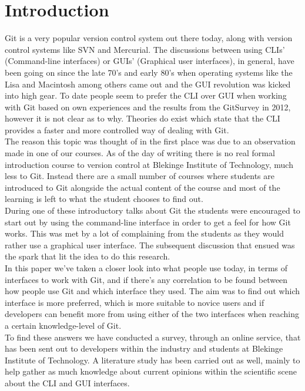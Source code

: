 \documentclass[a4paper,oneside]{bth} %
\begin{document}
		\chapter{Introduction}
		Git is a very popular version control system out there today, along with version control systems like SVN and Mercurial. The discussions between using CLIs' (Command-line interfaces) or GUIs' (Graphical user interfaces), in general, have been going on since the late 70's and early 80's when operating systems like the Lisa and Macintosh among others came out \cite{HistoryOfGUIWiki} and the GUI revolution was kicked into high gear.
		To date people seem to prefer the CLI over GUI when working with Git based on own experiences and the results from the GitSurvey in 2012\cite{GitUserSurvey}, however it is not clear as to why.
		Theories do exist which state that the CLI provides a faster and more controlled way of dealing with Git. \cite{GitUserSurvey}\cite{GitInClassroom}
		\\
		The reason this topic was thought of in the first place was due to an observation made in one of our courses. As of the day of writing there is no real formal introduction course to version control at Blekinge Institute of Technology, much less to Git. Instead there are a small number of courses where students are introduced to Git alongside the actual content of the course and most of the learning is left to what the student chooses to find out.\\
		During one of these introductory talks about Git the students were encouraged to start out by using the command-line interface in order to get a feel for how Git works. This was met by a lot of complaining from the students as they would rather use a graphical user interface. The subsequent discussion that ensued was the spark that lit the idea to do this research.
		\\
		In this paper we've taken a closer look into what people use today, in terms of interfaces to work with Git, and if there's any correlation to be found between how people use Git and which interface they used.
		The aim was to find out which interface is more preferred, which is more suitable to novice users and if developers can benefit more from using either of the two interfaces when reaching a certain knowledge-level of Git.\\
		To find these answers we have conducted a survey, through an online service, that has been sent out to developers within the industry and students at Blekinge Institute of Technology.
		A literature study has been carried out as well, mainly to help  gather as much knowledge about current opinions within the scientific scene about the CLI and GUI interfaces.
\end{document}

